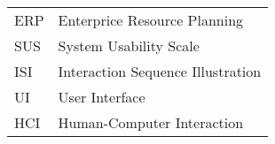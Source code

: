 \documentclass[12pt,a4paper,oneside,pdftex]{report}
\begin{document}
\noindent
\begin{longtable}{@{}p{}p{}@{}}
ERP & Enterprice Resource Planning \\
SUS & System Usability Scale \\
ISI & Interaction Sequence Illustration \\
UI & User Interface \\
HCI & Human-Computer Interaction

\end{longtable}


\cleardoublepage
\tableofcontents



\label{pages-prelude}
\cleardoublepage

\startfirstchapter

\pagestyle{headings}
\end{document}
